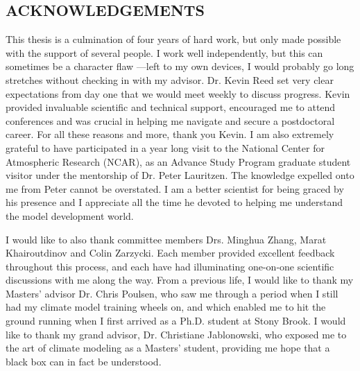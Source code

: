 \documentclass[12pt]{article}
\begin{document}
\newpage
\begin{center}
\section*{\bf{\normalsize ACKNOWLEDGEMENTS}}
\end{center}
\vspace*{4\baselineskip}
This thesis is a culmination of four years of hard work, but only made possible with the support of several people. I work well independently, but this can sometimes be a character flaw ---left to my own devices, I would probably go long stretches without checking in with my advisor. Dr. Kevin Reed set very clear expectations from day one that we would meet weekly to discuss progress. Kevin provided invaluable scientific and technical support, encouraged me to attend conferences and was crucial in helping me navigate and secure a postdoctoral career. For all these reasons and more, thank you Kevin. I am also extremely grateful to have participated in a year long visit to the National Center for Atmospheric Research (NCAR), as an Advance Study Program graduate student visitor under the mentorship of Dr. Peter Lauritzen. The knowledge expelled onto me from Peter cannot be overstated. I am a better scientist for being graced by his presence and I appreciate all the time he devoted to helping me understand the model development world.

I would like to also thank committee members Drs. Minghua Zhang, Marat Khairoutdinov and Colin Zarzycki. Each member provided excellent feedback throughout this process, and each have had illuminating one-on-one scientific discussions with me along the way. From a previous life, I would like to thank my Masters' advisor Dr. Chris Poulsen, who saw me through a period when I still had my climate model training wheels on, and which enabled me to hit the ground running when I first arrived as a Ph.D. student at Stony Brook. I would like to thank my grand advisor, Dr. Christiane Jablonowski, who exposed me to the art of climate modeling as a Masters' student, providing me hope that a black box can in fact be understood.
\end{document}
